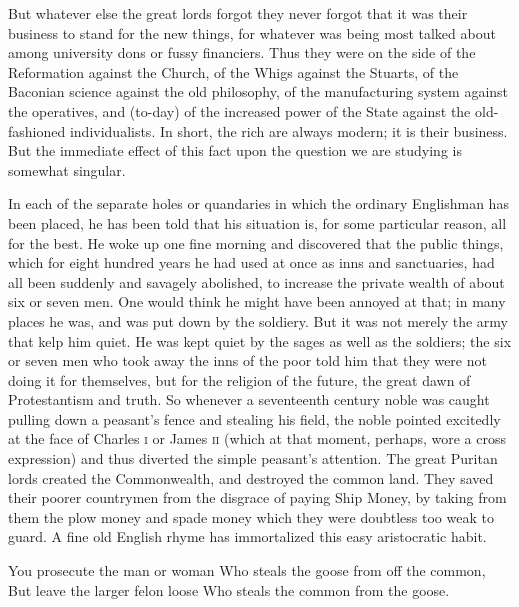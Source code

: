 \documentclass[final,10pt,letterpaper,twocolumn,openany]{book}
\begin{document}
But whatever else the great lords forgot they never forgot that it was
their business to stand for the new things, for whatever was being most
talked about among university dons or fussy financiers. Thus they were on
the side of the Reformation against the Church, of the Whigs against the
Stuarts, of the Baconian science against the old philosophy, of the
manufacturing system against the operatives, and (to-day) of the increased
power of the State against the old-fashioned individualists. In short, the
rich are always modern; it is their business. But the immediate effect of
this fact upon the question we are studying is somewhat singular.

In each of the separate holes or quandaries in which the ordinary
Englishman has been placed, he has been told that his situation is, for
some particular reason, all for the best. He woke up one fine morning and
discovered that the public things, which for eight hundred years he had
used at once as inns and sanctuaries, had all been suddenly and savagely
abolished, to increase the private wealth of about six or seven men. One
would think he might have been annoyed at that; in many places he was,
and was put down by the soldiery. But it was not merely the army that kelp
him quiet. He was kept quiet by the sages as well as the soldiers; the six or
seven men who took away the inns of the poor told him that they were not
doing it for themselves, but for the religion of the future, the great dawn of
Protestantism and truth. So whenever a seventeenth century noble was
caught pulling down a peasant's fence and stealing his field, the noble
pointed excitedly at the face of Charles \textsc{i} or James \textsc{ii} (which at that
moment, perhaps, wore a cross expression) and thus diverted the simple
peasant's attention. The great Puritan lords created the Commonwealth,
and destroyed the common land. They saved their poorer countrymen
from the disgrace of paying Ship Money, by taking from them the plow
money and spade money which they were doubtless too weak to guard. A
fine old English rhyme has immortalized this easy aristocratic habit.

You prosecute the man or woman Who steals the goose from off the
common, But leave the larger felon loose Who steals the common from
the goose.
\end{document}
